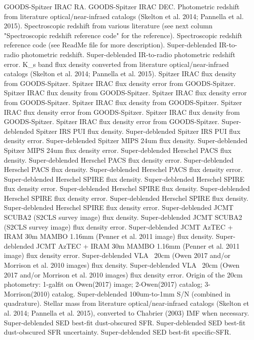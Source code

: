GOODS-Spitzer IRAC RA.
GOODS-Spitzer IRAC DEC.
Photometric redshift from literature optical/near-infraed catalogs (Skelton et al. 2014; Pannella et al. 2015).
Spectroscopic redshift from various literature (see next column "Spectroscopic redshift reference code" for the reference).
Spectroscopic redshift reference code (see ReadMe file for more description).
Super-deblended IR-to-radio photometric redshift.
Super-deblended IR-to-radio photometric redshift error.
K_s band flux density converted from literature optical/near-infraed catalogs (Skelton et al. 2014; Pannella et al. 2015).
Spitzer IRAC flux density from GOODS-Spitzer.
Spitzer IRAC flux density error from GOODS-Spitzer.
Spitzer IRAC flux density from GOODS-Spitzer.
Spitzer IRAC flux density error from GOODS-Spitzer.
Spitzer IRAC flux density from GOODS-Spitzer.
Spitzer IRAC flux density error from GOODS-Spitzer.
Spitzer IRAC flux density from GOODS-Spitzer.
Spitzer IRAC flux density error from GOODS-Spitzer.
Super-deblended Spitzer IRS PUI flux density.
Super-deblended Spitzer IRS PUI flux density error.
Super-deblended Spitzer MIPS 24um flux density.
Super-deblended Spitzer MIPS 24um flux density error.
Super-deblended Herschel PACS flux density.
Super-deblended Herschel PACS flux density error.
Super-deblended Herschel PACS flux density.
Super-deblended Herschel PACS flux density error.
Super-deblended Herschel SPIRE flux density.
Super-deblended Herschel SPIRE flux density error.
Super-deblended Herschel SPIRE flux density.
Super-deblended Herschel SPIRE flux density error.
Super-deblended Herschel SPIRE flux density.
Super-deblended Herschel SPIRE flux density error.
Super-deblended JCMT SCUBA2 (S2CLS survey image) flux density.
Super-deblended JCMT SCUBA2 (S2CLS survey image) flux density error.
Super-deblended JCMT AzTEC + IRAM 30m MAMBO 1.16mm (Penner et al. 2011 image) flux density.
Super-deblended JCMT AzTEC + IRAM 30m MAMBO 1.16mm (Penner et al. 2011 image) flux density error.
Super-deblended VLA ~20cm (Owen 2017 and/or Morrison et al. 2010 images) flux density.
Super-deblended VLA ~20cm (Owen 2017 and/or Morrison et al. 2010 images) flux density error.
Origin of the 20cm photometry: 1-galfit on Owen(2017) image; 2-Owen(2017) catalog; 3-Morrison(2010) catalog.
Super-deblended 100um-to-1mm S/N (combined in quadrature).
Stellar mass from literature optical/near-infraed catalogs (Skelton et al. 2014; Pannella et al. 2015), converted to Chabrier (2003) IMF when necessary.
Super-deblended SED best-fit dust-obscured SFR.
Super-deblended SED best-fit dust-obscured SFR uncertainty.
Super-deblended SED best-fit specific-SFR.
